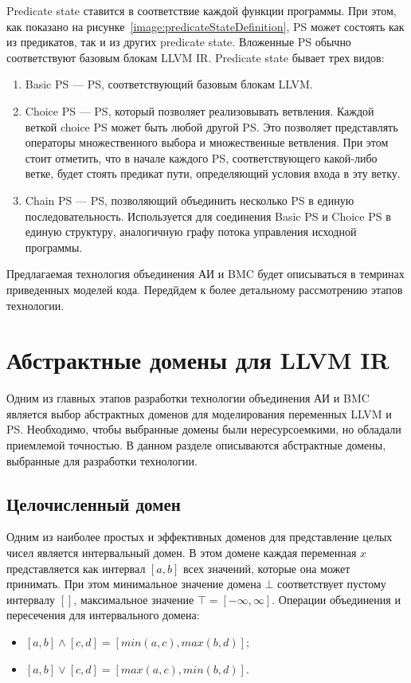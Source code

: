 Predicate state ставится в соответствие каждой функции программы. При этом, 
как показано на рисунке~\ref{image:predicateStateDefinition}, PS может 
состоять как из предикатов, так и из других predicate state. Вложенные PS 
обычно соответствуют базовым блокам LLVM IR. Predicate state бывает трех видов:
\begin{enumerate}
\item Basic PS --- PS, соответствующий базовым блокам LLVM.
\item Choice PS --- PS, который позволяет реализовывать ветвления. Каждой 
веткой choice PS может быть любой другой PS. Это позволяет представлять 
операторы множественного выбора и множественные ветвления. При этом стоит 
отметить, что в начале каждого PS, соответствующего какой-либо ветке, будет 
стоять предикат пути, определяющий условия входа в эту ветку.
\item Chain PS --- PS, позволяющий объединить несколько PS в единую 
последовательность. Используется для соединения Basic PS и Choice PS в единую 
структуру, аналогичную графу потока управления исходной программы.
\end{enumerate}

Предлагаемая технология объединения АИ и BMC будет описываться в темринах 
приведенных моделей кода. Передйдем к более детальному рассмотрению этапов
технологии.

\section{Абстрактные домены для LLVM IR}
Одним из главных этапов разработки технологии объединения АИ и BMC является
выбор абстрактных доменов для моделирования переменных LLVM и PS. Необходимо,
чтобы выбранные домены были нересурсоемкими, но обладали приемлемой точностью.
В данном разделе описываются абстрактные домены, выбранные для разработки 
технологии.

\subsection{Целочисленный домен}
Одним из наиболее простых и эффективных доменов для представление целых чисел 
является интервальный домен. В этом домене каждая переменная $x$ представляется
как интервал $[a, b]$ всех значений, которые она может принимать. При этом 
минимальное значение домена $\bot$ соответствует пустому интервалу $[]$,
максимальное значение $\top = [-\infty, \infty]$. Операции объединения и
пересечения для интервального домена:
\begin{itemize}
\item $[a, b] \wedge [c, d] = [min(a, c), max(b, d)]$;
\item $[a, b] \vee [c, d] = [max(a, c), min(b, d)]$.
\end{itemize}

